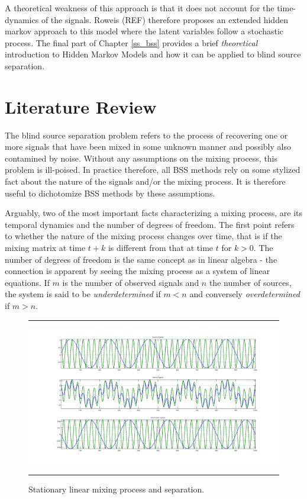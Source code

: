 \documentclass[11pt, oneside, a4paper]{report}
\begin{document}
A theoretical weakness of this
approach is that it does not account for the time-dynamics of the
signals. Roweis (REF) therefore proposes an extended hidden markov approach
to this model where the latent variables follow a stochastic process. 
The final part of Chapter \ref{ss_bss} provides a brief \emph{theoretical} introduction
to Hidden Markov Models and how it can be applied to blind source separation.



\chapter{Literature Review}

The blind source separation problem refers to the process of
recovering one or more signals that have been mixed in some unknown
manner and possibly also contamined by noise. Without any assumptions
on the mixing process, this problem is ill-poised. In practice
therefore, all BSS methods rely on some stylized fact about the nature
of the signals and/or the mixing process. It is therefore useful to
dichotomize BSS methods by these assumptions.


Arguably, two of the most important facts characterizing a mixing
process, are its temporal dynamics and the number of degrees of
freedom. The first point refers to whether the nature of the mixing
process changes over time, that is if the mixing matrix at time $t+k$
is different from that at time $t$ for $k>0$. The number of degrees of
freedom is the same concept as in linear algebra - the connection is
apparent by seeing the mixing process as a system of linear
equations. If $m$ is the number of observed signals and $n$ the number
of sources, the system is said to be \emph{underdetermined} if $m<n$
and conversely \emph{overdetermined} if $m>n$. 

\begin{figure}
  \centering
  \hrule
  \includegraphics[width = .9\textwidth]{ica_simple}
  \hrule
  \caption{Stationary linear mixing process and separation.}
  \label{pca_time_series}
\end{figure}
\end{document}
